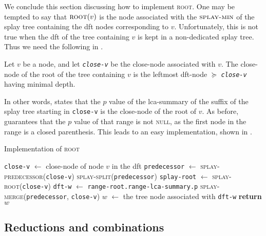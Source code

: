\documentclass[a4paper,USenglish]{lipics}
\newcommand{\var}[1]{\textrm{\texttt{#1}}}
\begin{document}
We conclude this section discussing how to implement \textsc{root}. One may be tempted to say that $\textsc{root}(v)$ is the node associated with the $\textsc{splay-min}$ of the splay tree containing the dft nodes corresponding to $v$. Unfortunately, this is not true when the dft of the tree containing $v$ is kept in a non-dedicated splay tree. Thus we need the following in .
			\begin{lemma}
				\label{prop:characterization of root}
				Let $v$ be a node, and let \emph{\var{close-v}} be the close-node associated with $v$. The close-node of the root of the tree containing $v$ is the leftmost dft-node $\succeq$ \emph{\var{close-v}} having minimal depth.
			\end{lemma}			

			
In other words,  states that the $p$ value of the lca-summary of the suffix of the splay tree starting in \var{close-v} is the close-node of the root of $v$. As before,  guarantees that the $p$ value of that range is not \textsc{null}, as the first node in the range is a closed parenthesis. This leads to an easy implementation, shown in .

			\begin{algorithm}[H]
			  \small
			  \caption{\small Implementation of \textsc{root}}
			  \label{algo:root}
			  \begin{algorithmic}[1]
					\State \var{close-v} $\gets$ close-node of node $v$ in the dft
				    \State \var{predecessor} $\gets$ \textsc{splay-predecessor}(\var{close-v})
				    \State \textsc{splay-split}(\var{predecessor})
				    \State \var{splay-root} $\gets$ \textsc{splay-root}(\var{close-v})
				    \State \var{dft-w} $\gets$ \var{range-root.range-lca-summary.p}
				    \State \textsc{splay-merge}(\var{predecessor}, \var{close-v})
				    \State $w$ $\gets$ the tree node associated with \var{dft-w}
				    \State \textbf{return} $w$
			    \EndProcedure
			  \end{algorithmic}
			\end{algorithm}

			
		\subsection{Reductions and combinations}
\label{sub:combine}
			
\end{document}
